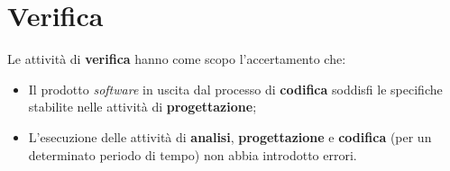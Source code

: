 



\section{Verifica}
Le attività di \textbf{verifica} hanno come scopo l'accertamento che:
\begin{itemize}
  \item Il prodotto \textit{software} in uscita dal processo di \textbf{codifica} soddisfi le specifiche stabilite nelle attività di \textbf{progettazione};
  \item L’esecuzione delle attività di \textbf{analisi}, \textbf{progettazione} e \textbf{codifica} (per un determinato periodo di tempo) non abbia introdotto errori.
\end{itemize}

